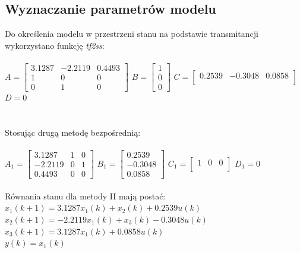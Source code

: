 \documentclass[a4paper, 11pt]{article}
\begin{document}
\subsection{Wyznaczanie parametrów modelu}
Do określenia modelu w przestrzeni stanu na podstawie transmitancji wykorzystano funkcję \emph{tf2ss}:\\
\\
\indent $A= \left[
        \begin{array}{ccc}
         3.1287	&-2.2119	&0.4493\\
         1	&0	&0\\
		 0 & 1&	0
         \end{array}
      \right]$
$B= \left[
        \begin{array}{c}
         1\\
         0\\
         0
         \end{array}
      \right]$
$C= \left[
        \begin{array}{ccc}
         0.2539&-0.3048	&0.0858\\
         \end{array}
      \right]$
$D=0$\\
\\
\\
Stosując drugą metodę bezpośrednią:\\
\\

$A_1= \left[
        \begin{array}{ccc}
		3.1287	&1	&0\\
		-2.2119	&0	&1\\
		0.4493	&0	&0
         \end{array}
      \right]$
$B_1= \left[
        \begin{array}{c}
		0.2539\\
		-0.3048\\
		0.0858
         \end{array}
      \right]$
$C_1= \left[
        \begin{array}{ccc}
         1&0&0\\
         \end{array}
      \right]$
$D_1=0$\\
\\

\noindent Równania stanu dla metody II mają postać:
\\

$x_1(k+1) = 3.1287x_1(k)+x_2(k)+ 0.2539u(k)$ \\
\indent$x_2(k+1) = -2.2119x_1(k)+x_3(k)-0.3048u(k)$ \\
\indent$x_3(k+1) = 3.1287x_1(k)+ 0.0858u(k)$ \\
\indent$y(k) = x_1(k)$ \\
\end{document}
